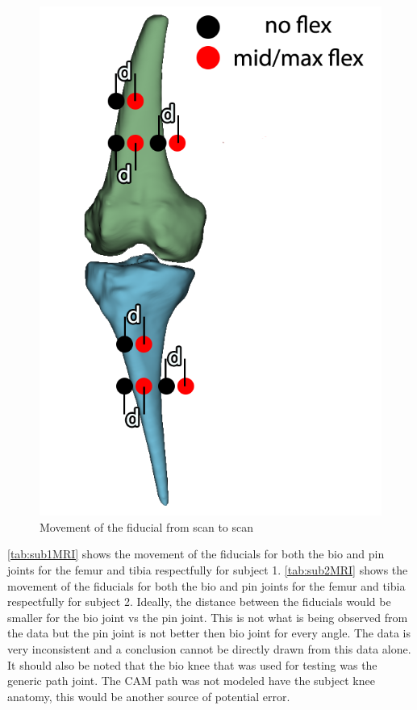 \begin{figure}
    \centering
    \includegraphics[scale=0.5]{images/mech_design/front view_edit.png}
    \caption{Movement of the fiducial from scan to scan}
    \label{fig:fiducialMovement}
\end{figure}


\autoref{tab:sub1MRI} shows the movement of the fiducials for both the bio and pin joints for the femur and tibia respectfully for subject 1. \autoref{tab:sub2MRI} shows the movement of the fiducials for both the bio and pin joints for the femur and tibia respectfully for subject 2. Ideally, the distance between the fiducials would be smaller for the bio joint vs the pin joint. This is not what is being observed from the data but the pin joint is not better then bio joint for every angle. The data is very inconsistent and a conclusion cannot be directly drawn from this data alone. It should also be noted that the bio knee that was used for testing was the generic path joint. The CAM path was not modeled have the subject knee anatomy, this would be another source of potential error.   




